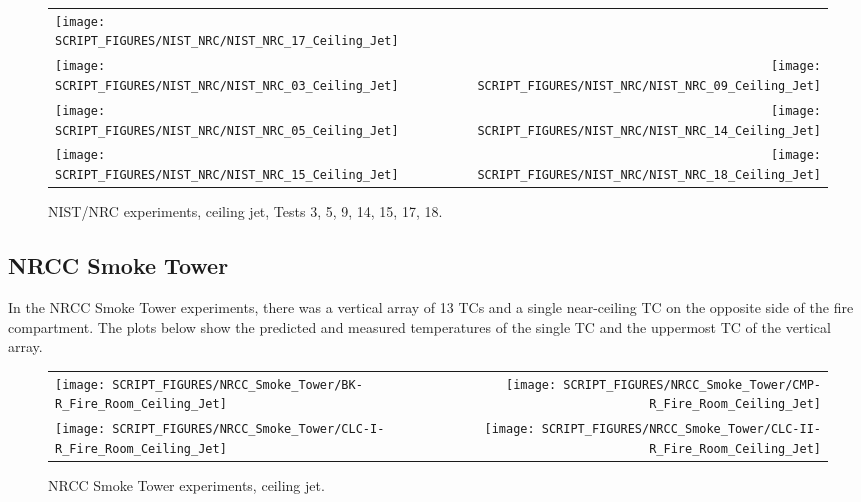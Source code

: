 \begin{figure}[p]
\begin{tabular*}{\textwidth}{l@{\extracolsep{\fill}}r}
\texttt{[image: SCRIPT\_FIGURES/NIST\_NRC/NIST\_NRC\_17\_Ceiling\_Jet]} &
 \\
\texttt{[image: SCRIPT\_FIGURES/NIST\_NRC/NIST\_NRC\_03\_Ceiling\_Jet]} &
\texttt{[image: SCRIPT\_FIGURES/NIST\_NRC/NIST\_NRC\_09\_Ceiling\_Jet]} \\
\texttt{[image: SCRIPT\_FIGURES/NIST\_NRC/NIST\_NRC\_05\_Ceiling\_Jet]} &
\texttt{[image: SCRIPT\_FIGURES/NIST\_NRC/NIST\_NRC\_14\_Ceiling\_Jet]} \\
\texttt{[image: SCRIPT\_FIGURES/NIST\_NRC/NIST\_NRC\_15\_Ceiling\_Jet]} &
\texttt{[image: SCRIPT\_FIGURES/NIST\_NRC/NIST\_NRC\_18\_Ceiling\_Jet]}
\end{tabular*}
\caption[NIST/NRC experiments, ceiling jet, Tests 3, 5, 9, 14, 15, 17, 18]
{NIST/NRC experiments, ceiling jet, Tests 3, 5, 9, 14, 15, 17, 18.}
\label{NIST_NRC_Jet_Open}
\end{figure}


\clearpage

\subsection{NRCC Smoke Tower}

In the NRCC Smoke Tower experiments, there was a vertical array of 13 TCs and a single near-ceiling TC on the opposite side of the fire compartment. The plots below show the predicted and measured temperatures of the single TC and the uppermost TC of the vertical array.

\begin{figure}[!ht]
\begin{tabular*}{\textwidth}{l@{\extracolsep{\fill}}r}
\texttt{[image: SCRIPT\_FIGURES/NRCC\_Smoke\_Tower/BK-R\_Fire\_Room\_Ceiling\_Jet]} &
\texttt{[image: SCRIPT\_FIGURES/NRCC\_Smoke\_Tower/CMP-R\_Fire\_Room\_Ceiling\_Jet]} \\
\texttt{[image: SCRIPT\_FIGURES/NRCC\_Smoke\_Tower/CLC-I-R\_Fire\_Room\_Ceiling\_Jet]} &
\texttt{[image: SCRIPT\_FIGURES/NRCC\_Smoke\_Tower/CLC-II-R\_Fire\_Room\_Ceiling\_Jet]}
\end{tabular*}
\caption{NRCC Smoke Tower experiments, ceiling jet.}
\label{NRCC_Smoke_Tower_Ceiling_Jet}
\end{figure}

\clearpage



